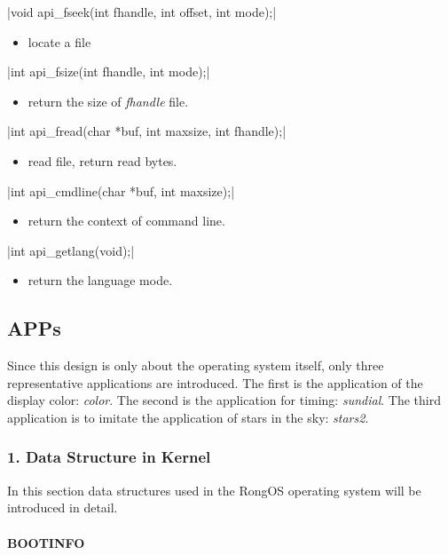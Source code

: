 \documentclass{swfcthesis}
\begin{document}
\csingle|void api_fseek(int fhandle, int offset, int mode);|
\begin{itemize}
\item locate a file
\end{itemize}

\csingle|int api_fsize(int fhandle, int mode);|
\begin{itemize}
\item return the size of \emph{fhandle} file.
\end{itemize}

\csingle|int api_fread(char *buf, int maxsize, int fhandle);|
\begin{itemize}
\item read file, return read bytes. 
\end{itemize}

\csingle|int api_cmdline(char *buf, int maxsize);|
\begin{itemize}
\item return the context of command line.
\end{itemize}

\csingle|int api_getlang(void);|
\begin{itemize}
\item return the language mode.
\end{itemize}

\subsection{APPs}
\label{sec:apps-1}
Since this design is only about the operating system itself, only three representative
applications are introduced. The first is the application of the display color:
\emph{color}. The second is the application for timing: \emph{sundial}. The third
application is to imitate the application of stars in the sky: \emph{stars2}.

\iffalse %
\subsubsection{1. Data Structure in Kernel}
In this section data structures used in the RongOS operating system will be introduced in
detail.

\paragraph{BOOTINFO}
\end{document}
